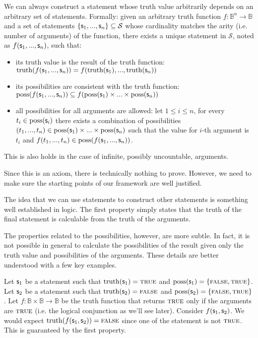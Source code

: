 \documentclass[11pt,letterpaper,fleqn]{memoir} %
\begin{document}
\begin{mathSection}
	\begin{axiom}\label{def_functions_of_statement}
		We can always construct a statement whose truth value arbitrarily depends on an arbitrary set of statements. Formally: given an arbitrary truth function $f : \mathbb{B}^n \to \mathbb{B}$ and a set of statements $\{\mathsf{s}_1, ..., \mathsf{s}_n\} \subseteq \mathcal{S}$  whose cardinality matches the arity (i.e. number of arguments) of the function, there exists a unique statement in $\mathcal{S}$, noted as $f(\mathsf{s}_1, ..., \mathsf{s}_n)$, such that:
		\begin{itemize}
			\item its truth value is the result of the truth function: \newline $\operatorname{truth}(f(\mathsf{s}_1, ..., \mathsf{s}_n)) = f(\operatorname{truth}(\mathsf{s}_1), ..., \operatorname{truth}(\mathsf{s}_n))$
			\item its possibilities are consistent with the truth function: \newline $\operatorname{poss}(f(\mathsf{s}_1, ..., \mathsf{s}_n)) \subseteq f(\operatorname{poss}(\mathsf{s}_1) \times ... \times \operatorname{poss}(\mathsf{s}_n))$
			\item all possibilities for all arguments are allowed:
			\newline let $1 \leq i \leq n$, for every $t_i \in \operatorname{poss}(\mathsf{s}_i)$ there exists a combination of possibilities $(t_1, ..., t_n) \in \operatorname{poss}(\mathsf{s}_1) \times ... \times \operatorname{poss}(\mathsf{s}_n)$ such that the value for $i$-th argument is $t_i$ and  $f(t_1, ..., t_n) \in \operatorname{poss}(f(\mathsf{s}_1, ..., \mathsf{s}_n))$.
		\end{itemize}
	This is also holds in the case of infinite, possibly uncountable, arguments.
	\end{axiom}
	\begin{justification}
		Since this is an axiom, there is technically nothing to prove. However, we need to make sure the starting points of our framework are well justified.
		
		The idea that we can use statements to construct other statements is something well established in logic. The first property simply states that the truth of the final statement is calculable from the truth of the arguments.
		
		The properties related to the possibilities, however, are more subtle. In fact, it is not possible in general to calculate the possibilities of the result given only the truth value and possibilities of the arguments. These details are better understood with a few key examples.
		
		Let $\mathsf{s}_1$ be a statement such that $\operatorname{truth}(\mathsf{s}_1) = \textsc{true}$ and $\operatorname{poss}(\mathsf{s}_1) = \{\textsc{false}, \textsc{true}\}$. Let $\mathsf{s}_2$ be a statement such that $\operatorname{truth}(\mathsf{s}_2) = \textsc{false}$ and $\operatorname{poss}(\mathsf{s}_2) = \{\textsc{false}, \textsc{true}\}$. Let $f : \mathbb{B} \times \mathbb{B} \to \mathbb{B}$ be the truth function that returns $\textsc{true}$ only if the arguments are $\textsc{true}$ (i.e. the logical conjunction as we'll see later). Consider $f(\mathsf{s}_1, \mathsf{s}_2)$. We would expect $\operatorname{truth}(f(\mathsf{s}_1, \mathsf{s}_2)) = \textsc{false}$ since one of the statement is not $\textsc{true}$. This is guaranteed by the first property.
		

\end{justification}
\end{mathSection}
\end{document}
